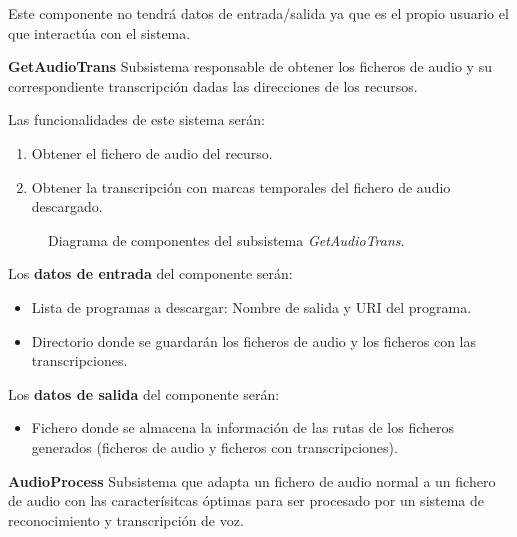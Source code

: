 \documentclass[../main.tex]{subfiles}
\begin{document}
Este componente no tendrá datos de entrada/salida ya que es el propio usuario el que interactúa con el sistema.

\textbf{GetAudioTrans}\label{par:getaudiotrans}
Subsistema responsable de obtener los ficheros de audio y su correspondiente transcripción dadas las direcciones de los recursos.

Las funcionalidades de este sistema serán:
\begin{enumerate}
    \item Obtener el fichero de audio del recurso.
    \item Obtener la transcripción con marcas temporales del fichero de audio descargado.
\end{enumerate}

\begin{figure}[H]
    \centering
    
    \label{fig:components_getaudiotrans}
    \caption{Diagrama de componentes del subsistema \textit{GetAudioTrans}.}
\end{figure}

Los \textbf{datos de entrada} del componente serán:
\begin{itemize}
    \item Lista de programas a descargar: Nombre de salida y \gls{URI} del programa.
    \item Directorio donde se guardarán los ficheros de audio y los ficheros con las transcripciones.
\end{itemize}

Los \textbf{datos de salida} del componente serán:
\begin{itemize}
    \item Fichero donde se almacena la información de las rutas de los ficheros generados (ficheros de audio y ficheros con transcripciones).
\end{itemize}

\textbf{AudioProcess}\label{par:audioprocess}
Subsistema que adapta un fichero de audio normal a un fichero de audio con las caracterísitcas óptimas para ser procesado por un sistema de reconocimiento y transcripción de voz.
\end{document}
